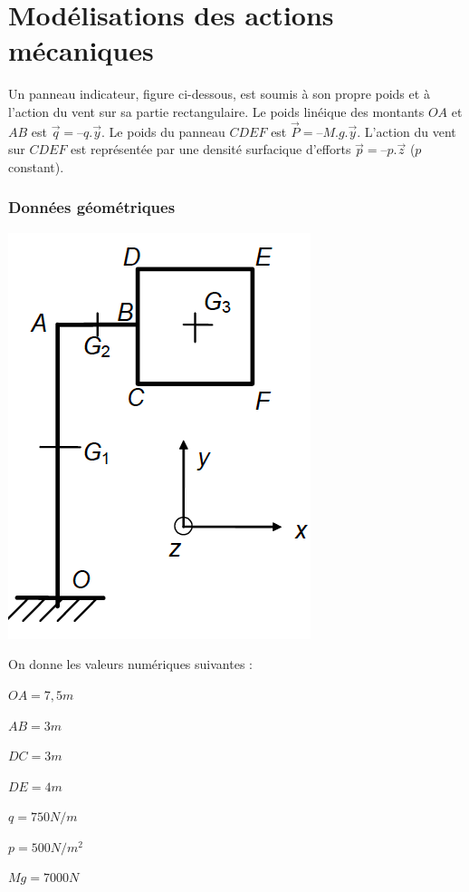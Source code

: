 \section{Modélisations des actions mécaniques}

Un panneau indicateur, figure ci-dessous, est soumis à son propre poids et à
l’action du vent sur sa partie rectangulaire. Le poids linéique des montants $OA$ et $AB$ est $\overrightarrow{q} = –q.\overrightarrow{y}$. Le poids du panneau $CDEF$ est $\overrightarrow{P} = – M.g.\overrightarrow{y}$. L’action du vent sur $CDEF$ est représentée par une densité surfacique d’efforts $\overrightarrow{p} = –p.\overrightarrow{z}$ ($p$ constant).

\subsubsection{Données géométriques}
\begin{center}
\includegraphics[scale=0.5]{png/panneau.png}
\end{center}
On donne les valeurs numériques suivantes :
\begin{description}
\item $OA = 7,5 m$
\item $AB = 3 m$
\item $DC = 3 m$
\item $DE = 4 m$
\item $q = 750 N/m$
\item $p = 500 N/m^2$
\item $Mg = 7000 N$
\end{description}

